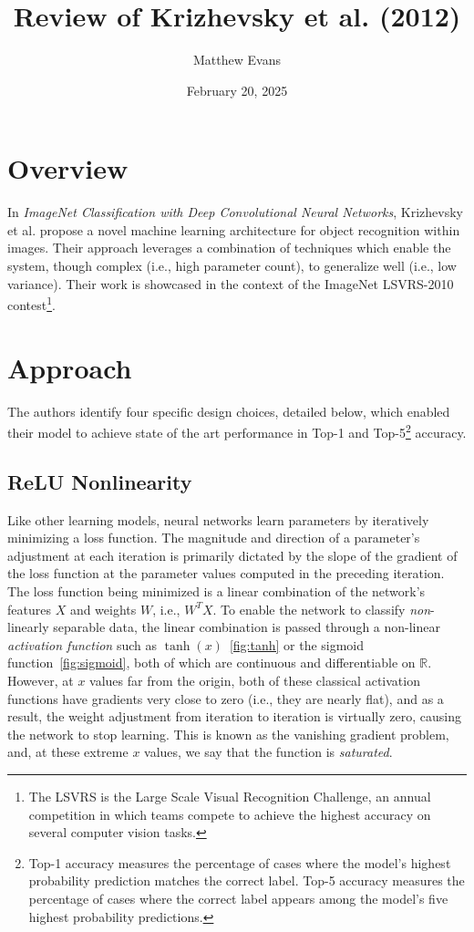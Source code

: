 \documentclass[10pt]{article}
\title{
    Review of Krizhevsky et al. (2012) \\
}
\author{Matthew Evans}
\date{February 20, 2025}
\begin{document}
\maketitle

\section*{Overview}
In \textit{ImageNet Classification with Deep Convolutional Neural Networks}, Krizhevsky et al.\cite{NIPS2012_c399862d} propose a novel machine learning architecture for object recognition within images. Their approach leverages a combination of techniques which enable the system, though complex (i.e., high parameter count), to generalize well (i.e., low variance). Their work is showcased in the context of the ImageNet LSVRS-2010 contest\footnote{The LSVRS is the Large Scale Visual Recognition Challenge, an annual competition in which teams compete to achieve the highest accuracy on several computer vision tasks.}.

\section*{Approach}
The authors identify four specific design choices, detailed below, which enabled their model to achieve state of the art performance in Top-1 and Top-5\footnote{Top-1 accuracy measures the percentage of cases where the model's highest probability prediction matches the correct label. Top-5 accuracy measures the percentage of cases where the correct label appears among the model's five highest probability predictions.} accuracy.

\subsection*{ReLU Nonlinearity}
Like other learning models, neural networks learn parameters by iteratively minimizing a loss function. The magnitude and direction of a parameter's adjustment at each iteration is primarily dictated by the slope of the gradient of the loss function at the parameter values computed in the preceding iteration. The loss function being minimized is a linear combination of the network's features \(X\) and weights \(W\), i.e., \(W^TX\). To enable the network to classify \textit{non}-linearly separable data, the linear combination is passed through a non-linear \textit{activation function} such as \(\tanh(x)\)~\ref{fig:tanh} or the sigmoid function~\ref{fig:sigmoid}, both of which are continuous and differentiable on \(\mathbb{R}\). However, at \(x\) values far from the origin, both of these classical activation functions have gradients very close to zero (i.e., they are nearly flat), and as a result, the weight adjustment from iteration to iteration is virtually zero, causing the network to stop learning. This is known as the vanishing gradient problem, and, at these extreme \(x\) values, we say that the function is \textit{saturated}.
\end{document}
